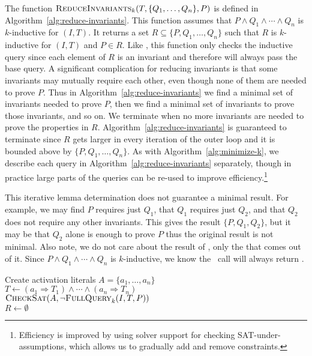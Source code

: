 The function $\textsc{ReduceInvariants}_k(T, \{Q_1, \ldots, Q_n\}, P)$ is defined in
Algorithm~\ref{alg:reduce-invariants}. This function assumes that $P
\land Q_1 \land \cdots \land Q_n$ is $k$-inductive for $(I, T)$. It
returns a set $R \subseteq \{P, Q_1, \ldots, Q_n\}$ such that $R$ is
$k$-inductive for $(I, T)$ and $P \in R$. Like \mink, this function
only checks the inductive query since each element of $R$ is an
invariant and therefore will always pass the base query. A significant
complication for reducing invariants is that some invariants may
mutually require each other, even though none of them are needed to prove
$P$. Thus in Algorithm~\ref{alg:reduce-invariants} we find a minimal
set of invariants needed to prove $P$, then we find a minimal set of
invariants to prove those invariants, and so on. We terminate when no
more invariants are needed to prove the properties in $R$.
Algorithm~\ref{alg:reduce-invariants} is guaranteed to terminate since
$R$ gets larger in every iteration of the outer loop and it is bounded
above by $\{P, Q_1, \ldots, Q_n\}$. As with
Algorithm~\ref{alg:minimize-k}, we describe each query in
Algorithm~\ref{alg:reduce-invariants} separately, though in practice
large parts of the queries can be re-used to improve efficiency.\footnote{Efficiency is improved by using solver support for checking SAT-under-assumptions, which allows us to gradually add and remove constraints.}

This iterative lemma determination does not guarantee a minimal
result. For example, we may find $P$ requires just $Q_1$, that $Q_1$
requires just $Q_2$, and that $Q_2$ does not require any other
invariants. This gives the result $\{P, Q_1, Q_2\}$, but it may be
that $Q_2$ alone is enough to prove $P$ thus the original result is
not minimal. Also note, we do not care about the result of \checksat,
only the \unsatcore that comes out of it. Since $P \land Q_1 \land
\cdots \land Q_n$ is $k$-inductive, we know the \checksat\ call will
always return \unsat.

\begin{algorithm}[t]
  Create activation literals $A = \{a_1, \ldots, a_n\}$ \\
  $T \leftarrow (a_1 \Rightarrow T_1) \land \cdots \land (a_n \Rightarrow T_n)$ \\
  $\textsc{CheckSat}(A, \neg\textsc{FullQuery}_k(I, T, P))$ \\
  $R \leftarrow \emptyset$ \\
\caption{$\minivc_k(I, \{T_1, \ldots, T_n\}, P)$}
\label{alg:minimize-ivc}
\end{algorithm}

